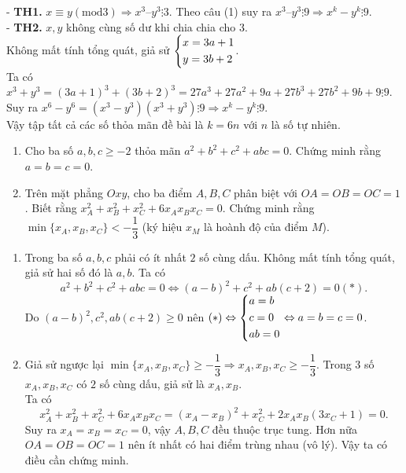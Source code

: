 \begin{ex}
{\begin{enumerate}
-	{\bf TH1.} $x \equiv y (\text{mod} 3)  \Rightarrow x^3 –y^3 \vdots 3$. Theo câu (1) suy ra $x^3 –y^3 \vdots 9 \Rightarrow x^k-y^k \vdots 9$.\\
-	{\bf TH2.} $x, y$ không cùng số dư khi chia chia cho $3$. \\
Không mất tính tổng quát, giả sử $\left\{\begin{aligned}& x = 3a+1 \\& y=3b+2\end{aligned}\right.$.\\
Ta có $x^3+y^3=(3a+1)^3+(3b+2)^3=27a^3+27a^2+9a+27b^3+27b^2+9b+9 \vdots 9$.\\
Suy ra $x^6-y^6=(x^3-y^3)(x^3+y^3) \vdots 9 \Rightarrow x^k-y^k \vdots 9$.\\
Vậy tập tất cả các số thỏa mãn đề bài là $k=6n$ với $n$ là số tự nhiên.

    \end{enumerate}
    }
\end{ex}

\begin{ex}%
    \hfill
    \begin{enumerate}
        \item Cho ba số $a, b, c \ge -2$ thỏa mãn $a^2+b^2+c^2+abc=0$. Chứng minh rằng $a=b=c=0$.
        \item Trên mặt phẳng $Oxy$, cho ba điểm $A, B, C$ phân biệt với $OA=OB=OC=1$. Biết rằng $x_A^2+x_B^2+x_C^2+6x_A x_B x_C=0$. Chứng minh rằng $\min\{ x_A, x_B, x_C\} < -\dfrac{1}{3}$ (ký hiệu $x_M$ là hoành độ của điểm $M$).
    \end{enumerate}
\loigiai
    {
    \begin{enumerate}
        \item Trong ba số $a, b, c$ phải có ít nhất $2$ số cùng dấu. Không mất tính tổng quát, giả sử hai số đó là $a, b$. Ta có
\[a^2+b^2+c^2+abc=0 \Leftrightarrow (a-b)^2+c^2+ab(c+2) =0 (*).\]
Do $(a-b)^2, c^2, ab(c+2) \ge 0$ nên $(*) \Leftrightarrow \left\{\begin{aligned}& a=b\\ &c=0 \\ &ab=0\end{aligned}\right. \Leftrightarrow a=b=c=0$.

        \item Giả sử ngược lại $\min \{x_A, x_B, x_C\} \ge -\dfrac{1}{3} \Rightarrow x_A, x_B, x_C \ge -\dfrac{1}{3}$. Trong $3$ số $x_A, x_B, x_C$ có $2$ số cùng dấu, giả sử là $x_A, x_B$.\\
Ta có 
\[x_A^2+ x_B^2+ x_C^2+6x_A x_B x_C= (x_A-x_B)^2+x_C^2+2x_A x_B(3x_C+1)=0.\]
Suy ra $x_A=x_B=x_C=0$, vậy $A, B, C$ đều thuộc trục tung. Hơn nữa $OA=OB=OC=1$ nên ít nhất có hai điểm trùng nhau (vô lý). Vậy ta có điều cần chứng minh.

    \end{enumerate}
    }
\end{ex}

